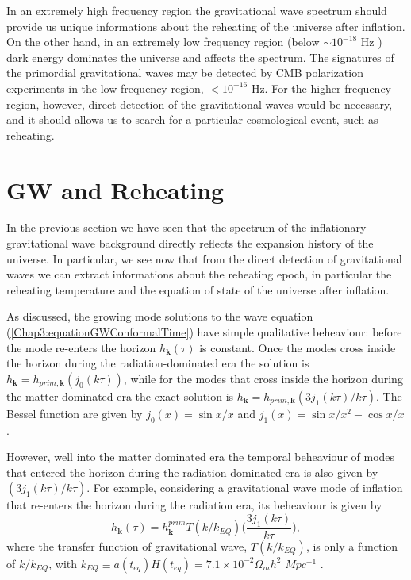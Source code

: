 \documentclass[11pt,a4paper,twoside]{book}
\begin{document}
 In an extremely high frequency region the gravitational wave spectrum should provide us unique informations about the reheating of the universe after inflation. On the other hand, in an extremely low frequency region (below $ \sim 10^{-18}$ Hz ) dark energy dominates the universe and affects the spectrum. The signatures of the primordial gravitational waves may be detected  by CMB polarization experiments in the low frequency region, $ < 10^{-16} $ Hz. For the higher frequency region, however, direct detection of the gravitational waves would be necessary, and it should allows us to search for a particular cosmological event, such as reheating.
\section{GW and Reheating}
In the previous section we have seen that the spectrum of the inflationary gravitational wave background directly reflects the expansion history of the universe. In particular, we see now that from  the direct detection of  gravitational waves we can extract informations about the reheating epoch, in particular the reheating temperature and the equation of state of the universe after inflation. 

As discussed, the growing mode solutions to the wave equation (\ref{Chap3:equationGWConformalTime}) have simple qualitative beheaviour: before the mode re-enters the horizon $ h_{\textbf{k}}(\tau) $ is constant. Once the modes cross inside the horizon during the radiation-dominated era the solution is $ h_{\textbf{k}}=h_{prim,\textbf{k}}(j_{0}(k\tau)) $, while for the modes that cross inside the horizon during the matter-dominated era the exact solution is $  h_{\textbf{k}}=h_{prim,\textbf{k}}(3j_{1}(k\tau)/k\tau) $. The Bessel function are given by $ j_{0}(x) = \sin x/x $ and $ j_{1}(x)= \sin x/x^{2} - \cos x/x $.

However, well into the matter dominated era the temporal beheaviour of modes that entered the horizon during the radiation-dominated era is also given by $(3j_{1}(k\tau)/k\tau)$.  For example, considering a gravitational wave mode of inflation that re-enters the horizon during the radiation era, its beheaviour is given by
\begin{equation}
\label{Chap3:GWSimpleBeheaviour}
h_{\textbf{k}}(\tau)=h_{\textbf{k}}^{prim}T(k/k_{EQ})\Big (\frac{3j_{1}(k\tau)}{k\tau}\Big),
\end{equation} 
where the transfer function of gravitational wave, $ T(k/k_{EQ}) $, is only a function of $ k/k_{EQ} $, with $ k_{EQ} \equiv a(t_{eq})H (t_{eq}) = 7.1 \times 10^{-2}\Omega_{m}h^{2} $ $ Mpc^{-1} $ \cite{Chap3:GW_Turner_White}.
\end{document}
